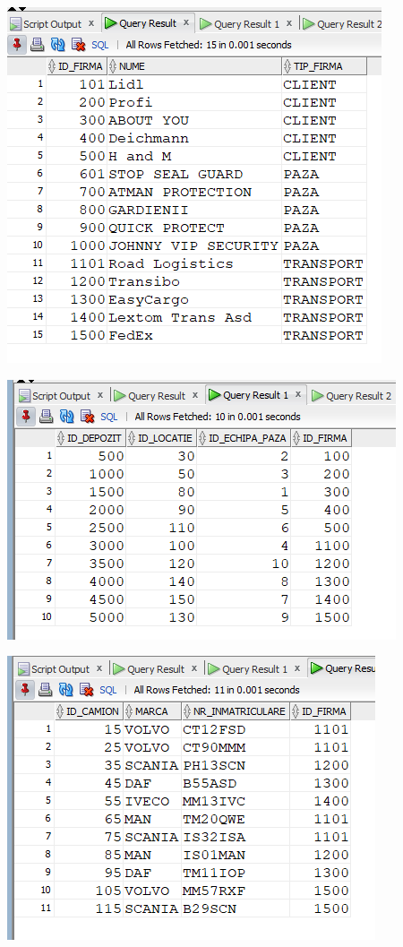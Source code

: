 \documentclass[12pt, a4paper]{article}
\begin{document}
\includegraphics[width=\textwidth]{10_8.png}

\includegraphics[width=\textwidth]{10_9.png}

\includegraphics[width=\textwidth]{10_10.png}
\end{document}
